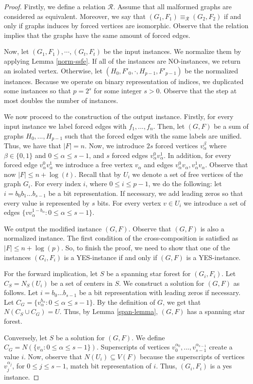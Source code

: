 \documentclass[en]{pracamgr}
\theoremstyle{definition}
\begin{document}
\begin{proof}
	Firstly, we define a relation $\mathcal{R}$. Assume that all malformed graphs are considered as equivalent. Moreover, we say that $(G_1,F_1) \equiv_\mathcal{R} (G_2,F_2)$ if and only if graphs induces by forced vertices are isomorphic. Observe that the relation implies that the graphs have the same amount of forced edges.
	
	Now, let $(G_1,F_1),\cdots,(G_t,F_t)$ be the input instances. We normalize them by applying Lemma \ref{norm-ssfe}. If all of the instances are NO-instances, we return an isolated vertex. Otherwise, let $(H_0,F'_0,\cdot,H_{p-1},F'_{p-1})$ be the normalized instances. Because we operate on binary representation of indices, we duplicated some instances so that $p=2^s$ for some integer $s>0$. Observe that the step at most doubles the number of instances.
	
	We now proceed to the construction of the output instance. Firstly, for every input instance we label forced edges with $f_1,...,f_n$. Then, let $(G,F)$ be a sum of graphs $H_0,...,H_{p-1}$ such that the forced edges with the same labels are unified. Thus, we have that $|F|=n$. Now, we introduce $2s$ forced vertices $v_\alpha^\beta$ where $\beta \in \{0,1\}$ and $0 \leq \alpha \leq s-1$, and $s$ forced edges $v_\alpha^0v_\alpha^1$. In addition, for every forced edge $v_\alpha^0v_\alpha^1$ we introduce a free vertex $v_\alpha$ and edges $v_\alpha^0v_\alpha,v_\alpha^1v_\alpha$. Observe that now $|F|\leq n + \log(t)$. Recall that by $U_i$ we denote a set of free vertices of the graph $G_i$. For every index $i$, where $0 \leq i \leq p-1$, we do the following: let $i=b_0b_1...b_{s-1}$ be a bit representation. If necessary, we add leading zeros so that every value is represented by $s$ bits. For every vertex $v \in U_i$ we introduce a set of edges $\{vv^{1-b_\alpha}_\alpha: 0 \leq \alpha \leq s-1\}$.
	
	We output the modified instance $(G,F)$. Observe that $(G,F)$ is also a normalized instance. The first condition of the cross-composition is satisfied as $|F| \leq n + \log(p)$. So, to finish the proof, we need to show that one of the instances $(G_i,F_i)$ is a YES-instance if and only if $(G,F)$ is a YES-instance.
	
	For the forward implication, let $S$ be a spanning star forest for $(G_i,F_i)$. Let $C_S = N_S(U_i)$ be a set of centers in $S$. We construct a solution for $(G,F)$ as follows. Let $i=b_0...b_{s-1}$ be a bit representation with leading zeros if necessary. Let $C_G = \{v_{\alpha}^{b_\alpha}: 0 \leq \alpha \leq s-1\}$. By the definition of $G$, we get that $N(C_S \cup C_G) = U$. Thus, by Lemma \ref{span-lemma}, $(G,F)$ has a spanning star forest.
	
	Conversely, let $S$ be a solution for $(G,F)$. We define $C_G = N(\{v_\alpha: 0 \leq \alpha \leq s-1\})$. Superscripts of vertices $v^{\alpha_0}_0,...,v^{\alpha_{s-1}}_{s-1}$ create a value $i$. Now, observe that $N(U_i) \subseteq V(F)$ because the superscripts of vertices $v^{\alpha_j}_j$, for $0 \leq j \leq s-1$, match bit representation of $i$. Thus, $(G_i,F_i)$ is a yes instance.
\end{proof}
\end{document}
